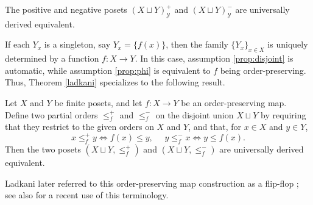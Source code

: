\begin{theorem}\label{ladkani}

\cite[Theorem~1.1]{ladkani}
The positive and negative posets $(X \sqcup Y)^+_{\mathcal{Y}}$ and $(X \sqcup Y)^-_{\mathcal{Y}}$ are universally derived equivalent.

\end{theorem}

If each $Y_x$ is a singleton, say $Y_x=\{f(x)\}$, then the family $\{Y_x\}_{x \in X}$ is uniquely determined by a function $f \colon X \to Y$. In this case, assumption \cref{prop:disjoint} is automatic, while assumption \cref{prop:phi} is equivalent to $f$ being order-preserving. Thus, Theorem \ref{ladkani} specializes to the following result.

\begin{proposition}\cite[Corollary~1.3]{ladkani}\label{Ladkani singleton}
    Let $X$ and $Y$ be finite posets, and let $f \colon X \to Y$ be an order-preserving map. Define two partial orders $\leq_f^+$ and $\leq_f^-$ on the disjoint union $X \sqcup Y$ by requiring that they restrict to the given orders on $X$ and $Y$, and that, for $x \in X$ and $y \in Y$, 
    \[x \leq_f^+ y \iff f(x) \leq y, \,\,\,\,\,\,\,\, y \leq_f^- x \iff y \leq f(x).\]
    Then the two posets $(X \sqcup Y, \leq_f^+)$ and $(X \sqcup Y, \leq_f^-)$ are universally derived equivalent.
\end{proposition}

Ladkani later referred to this order-preserving map construction as a flip-flop \cite{ladkani2}; see also \cite[Section 5]{Goguet} for a recent use of this terminology.